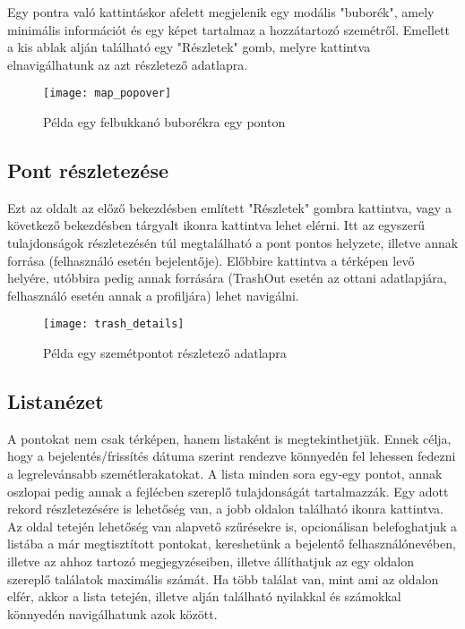Egy pontra való kattintáskor afelett megjelenik egy modális "buborék", amely minimális információt és egy képet tartalmaz a hozzátartozó szemétről. Emellett a kis ablak alján található egy "Részletek" gomb, melyre kattintva elnavigálhatunk az azt részletező adatlapra.

\begin{figure}[H]
	\centering
	\texttt{[image: map\_popover]}
	\caption{Példa egy felbukkanó buborékra egy ponton}
	\label{fig:map_popover}
\end{figure}

\subsection{Pont részletezése}
\label{subsec:trash_details}

Ezt az oldalt az előző bekezdésben említett "Részletek" gombra kattintva, vagy a következő bekezdésben tárgyalt  ikonra kattintva lehet elérni. Itt az egyszerű tulajdonságok részletezésén túl megtalálható a pont pontos helyzete, illetve annak forrása (felhasználó esetén bejelentője). Előbbire kattintva a térképen levő helyére, utóbbira pedig annak forrására (TrashOut esetén az ottani adatlapjára, felhasználó esetén annak a profiljára) lehet navigálni.

\begin{figure}[H]
	\centering
	\texttt{[image: trash\_details]}
	\caption{Példa egy szemétpontot részletező adatlapra}
	\label{fig:trash_details}
\end{figure}

\subsection{Listanézet}
\label{subsec:trash_index}

A pontokat nem csak térképen, hanem listaként is megtekinthetjük. Ennek célja, hogy a bejelentés/frissítés dátuma szerint rendezve könnyedén fel lehessen fedezni a legrelevánsabb szemétlerakatokat. A lista minden sora egy-egy pontot, annak oszlopai pedig annak a fejlécben szereplő tulajdonságát tartalmazzák. Egy adott rekord részletezésére is lehetőség van, a jobb oldalon található  ikonra kattintva. Az oldal tetején lehetőség van alapvető szűrésekre is, opcionálisan belefoghatjuk a listába a már megtisztított pontokat, kereshetünk a bejelentő felhasználónevében, illetve az ahhoz tartozó megjegyzéseiben, illetve állíthatjuk az egy oldalon szereplő találatok maximális számát. Ha több találat van, mint ami az oldalon elfér, akkor a lista tetején, illetve alján található nyilakkal és számokkal könnyedén navigálhatunk azok között.

